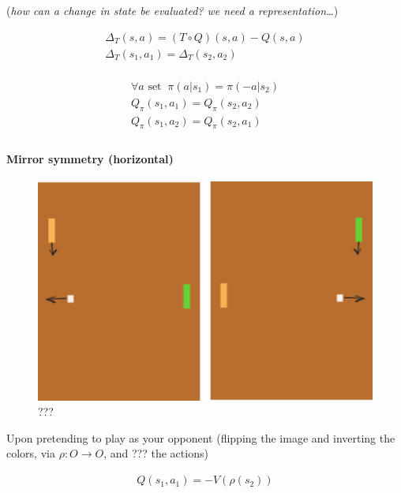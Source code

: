 (\emph{how can a change in state be evaluated? we need a
representation\ldots{}})

\begin{align}
\Delta_{T}(s, a) = (T \circ Q)(s,a) - Q(s,a)\\
\Delta_{T}(s_1, a_1) = \Delta_{T}(s_2, a_2) \\
\end{align}

\begin{align}
\forall a \text{ set}\;\;\pi(a | s_1) = \pi(-a| s_2) \\
Q_\pi(s_1, a_1) = Q_\pi(s_2, a_2) \\
Q_\pi(s_1, a_2) = Q_\pi(s_2, a_1) \\
\end{align}

\hypertarget{mirror-symmetry-horizontal}{%
\paragraph{Mirror symmetry
(horizontal)}\label{mirror-symmetry-horizontal}}

\begin{figure}
\centering
\includegraphics[width=1\textwidth,height=0.25\textheight]{../../pictures/drawings/pong-horz-flip.png}
\caption{???}
\end{figure}

Upon pretending to play as your opponent (flipping the image and
inverting the colors, via \(\rho: O \to O\), and ??? the actions)

\begin{align}
Q(s_1, a_1) = - V(\rho(s_2)) \\
\end{align}

